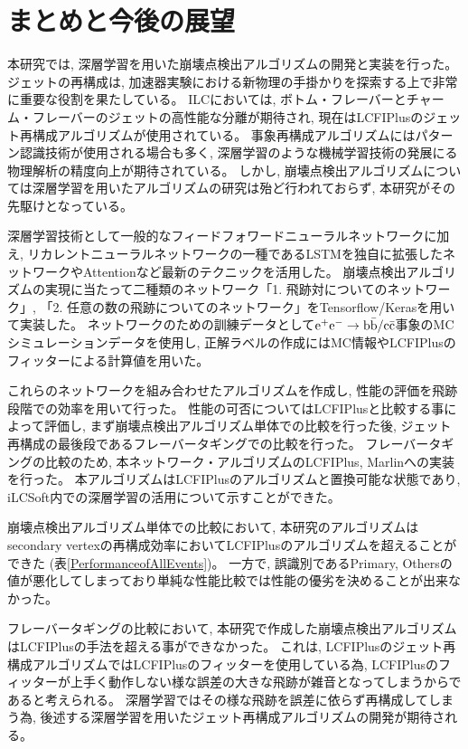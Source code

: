 
\chapter{まとめと今後の展望} \label{chap:Conclusion}

本研究では, 深層学習を用いた崩壊点検出アルゴリズムの開発と実装を行った。
ジェットの再構成は, 加速器実験における新物理の手掛かりを探索する上で非常に重要な役割を果たしている。
ILCにおいては, ボトム・フレーバーとチャーム・フレーバーのジェットの高性能な分離が期待され, 現在はLCFIPlusのジェット再構成アルゴリズムが使用されている。
事象再構成アルゴリズムにはパターン認識技術が使用される場合も多く, 深層学習のような機械学習技術の発展にる物理解析の精度向上が期待されている。
しかし, 崩壊点検出アルゴリズムについては深層学習を用いたアルゴリズムの研究は殆ど行われておらず, 本研究がその先駆けとなっている。

深層学習技術として一般的なフィードフォワードニューラルネットワークに加え, リカレントニューラルネットワークの一種であるLSTMを独自に拡張したネットワークやAttentionなど最新のテクニックを活用した。
崩壊点検出アルゴリズムの実現に当たって二種類のネットワーク「1. 飛跡対についてのネットワーク」, 「2. 任意の数の飛跡についてのネットワーク」をTensorflow/Kerasを用いて実装した。
ネットワークのための訓練データとして$\rm e^+e^- \to b \bar{b}/c \bar{c}$事象のMCシミュレーションデータを使用し, 正解ラベルの作成にはMC情報やLCFIPlusのフィッターによる計算値を用いた。

これらのネットワークを組み合わせたアルゴリズムを作成し, 性能の評価を飛跡段階での効率を用いて行った。
性能の可否についてはLCFIPlusと比較する事によって評価し, まず崩壊点検出アルゴリズム単体での比較を行った後, ジェット再構成の最後段であるフレーバータギングでの比較を行った。
フレーバータギングの比較のため, 本ネットワーク・アルゴリズムのLCFIPlus, Marlinへの実装を行った。
本アルゴリズムはLCFIPlusのアルゴリズムと置換可能な状態であり, iLCSoft内での深層学習の活用について示すことができた。

崩壊点検出アルゴリズム単体での比較において, 本研究のアルゴリズムはsecondary vertexの再構成効率においてLCFIPlusのアルゴリズムを超えることができた (表\ref{PerformanceofAllEvents})。
一方で, 誤識別であるPrimary, Othersの値が悪化してしまっており単純な性能比較では性能の優劣を決めることが出来なかった。

フレーバータギングの比較において, 本研究で作成した崩壊点検出アルゴリズムはLCFIPlusの手法を超える事ができなかった。
これは, LCFIPlusのジェット再構成アルゴリズムではLCFIPlusのフィッターを使用している為, LCFIPlusのフィッターが上手く動作しない様な誤差の大きな飛跡が雑音となってしまうからであると考えられる。
深層学習ではその様な飛跡を誤差に依らず再構成してしまう為, 後述する深層学習を用いたジェット再構成アルゴリズムの開発が期待される。\\

